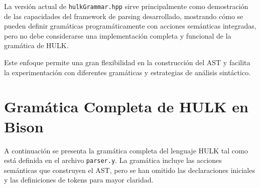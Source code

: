 \documentclass{article}
\begin{document}
La versión actual de \texttt{hulkGrammar.hpp} sirve principalmente como demostración de las capacidades del framework de parsing desarrollado, mostrando cómo se pueden definir gramáticas programáticamente con acciones semánticas integradas, pero no debe considerarse una implementación completa y funcional de la gramática de HULK.

Este enfoque permite una gran flexibilidad en la construcción del AST y facilita la experimentación con diferentes gramáticas y estrategias de análisis sintáctico.

\appendix
\section{Gramática Completa de HULK en Bison}
\label{sec:gramatica_bison}

A continuación se presenta la gramática completa del lenguaje HULK tal como está definida en el archivo \texttt{parser.y}. La gramática incluye las acciones semánticas que construyen el AST, pero se han omitido las declaraciones iniciales y las definiciones de tokens para mayor claridad.
\end{document}
